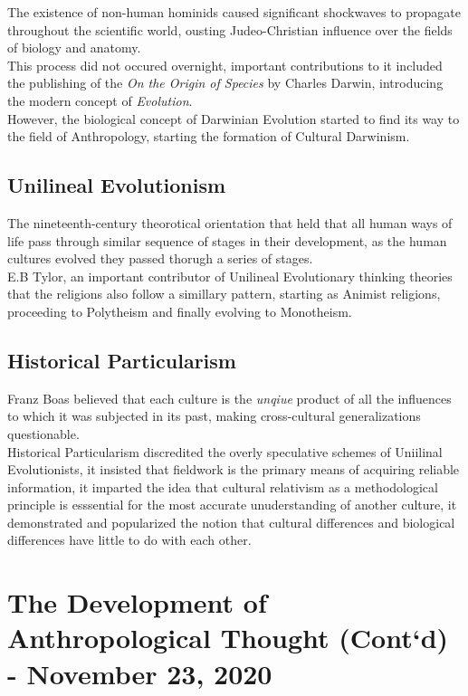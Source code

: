 \documentclass[11pt,a4paper]{book}
\begin{document}
The existence of non-human hominids caused significant shockwaves to propagate throughout the scientific world, ousting Judeo-Christian influence over the fields of biology and anatomy.\\

This process did not occured overnight, important contributions to it included the publishing of the \textit{On the Origin of Species} by Charles Darwin, introducing the modern concept of \textit{Evolution}.\\

However, the biological concept of Darwinian Evolution started to find its way to the field of Anthropology, starting the formation of Cultural Darwinism.

\section{Unilineal Evolutionism}

The nineteenth-century theorotical orientation that held that all human ways of life pass through similar sequence of stages in their development, as the human cultures evolved they passed thorugh a series of stages.\\

E.B Tylor, an important contributor of Unilineal Evolutionary thinking theories that the religions also follow a simillary pattern, starting as Animist religions, proceeding to Polytheism and finally evolving to Monotheism.

\section{Historical Particularism}

Franz Boas believed that each culture is the \textit{unqiue} product of all the influences to which it was subjected in its past, making cross-cultural generalizations questionable.\\

Historical Particularism discredited the overly speculative schemes of Uniilinal Evolutionists, it insisted that fieldwork is the primary means of acquiring reliable information, it imparted the idea that cultural relativism as a methodological principle is esssential for the most accurate unuderstanding of another culture, it demonstrated and popularized the notion that cultural differences and biological differences have little to do with each other.

\chapter{The Development of Anthropological Thought (Cont`d) - November 23, 2020}
\end{document}
